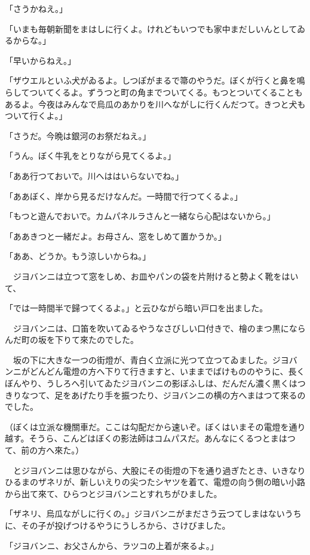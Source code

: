 \documentclass[tate,paper=b6j,jafontsize=9pt]{jlreq}
\begin{document}
「さうかねえ。」

「いまも毎朝新聞をまはしに行くよ。けれどもいつでも家中まだしいんとしてゐるからな。」

「早いからねえ。」

「ザウエルといふ犬がゐるよ。しつぽがまるで箒のやうだ。ぼくが行くと鼻を鳴らしてついてくるよ。ずうつと町の角までついてくる。もつとついてくることもあるよ。今夜はみんなで烏瓜のあかりを川へながしに行くんだつて。きつと犬もついて行くよ。」

「さうだ。今晩は銀河のお祭だねえ。」

「うん。ぼく牛乳をとりながら見てくるよ。」

「ああ行つておいで。川へははいらないでね。」

「ああぼく、岸から見るだけなんだ。一時間で行つてくるよ。」

「もつと遊んでおいで。カムパネルラさんと一緒なら心配はないから。」

「ああきつと一緒だよ。お母さん、窓をしめて置かうか。」

「ああ、どうか。もう涼しいからね。」

　ジヨバンニは立つて窓をしめ、お皿やパンの袋を片附けると勢よく靴をはいて、

「では一時間半で歸つてくるよ。」と云ひながら暗い戸口を出ました。



　ジヨバンニは、口笛を吹いてゐるやうなさびしい口付きで、檜のまつ黒にならんだ町の坂を下りて來たのでした。

　坂の下に大きな一つの街燈が、青白く立派に光つて立つてゐました。ジヨバンニがどんどん電燈の方へ下りて行きますと、いままでばけもののやうに、長くぼんやり、うしろへ引いてゐたジヨバンニの影ぼふしは、だんだん濃く黒くはつきりなつて、足をあげたり手を振つたり、ジヨバンニの横の方へまはつて來るのでした。

（ぼくは立派な機關車だ。ここは勾配だから速いぞ。ぼくはいまその電燈を通り越す。そうら、こんどはぼくの影法師はコムパスだ。あんなにくるつとまはつて、前の方へ來た。）

　とジヨバンニは思ひながら、大股にその街燈の下を通り過ぎたとき、いきなりひるまのザネリが、新しいえりの尖つたシヤツを着て、電燈の向う側の暗い小路から出て來て、ひらつとジヨバンニとすれちがひました。

「ザネリ、烏瓜ながしに行くの。」ジヨバンニがまださう云つてしまはないうちに、その子が投げつけるやうにうしろから、さけびました。

「ジヨバンニ、お父さんから、ラツコの上着が來るよ。」
\end{document}
